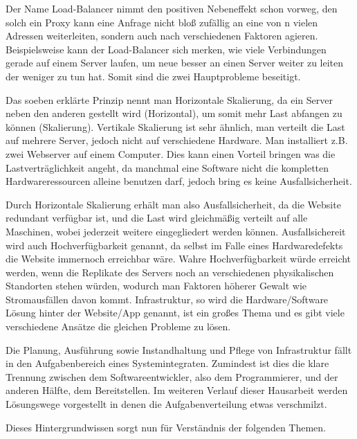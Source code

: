 Der Name Load-Balancer nimmt den positiven Nebeneffekt schon vorweg, den solch ein Proxy kann eine Anfrage nicht bloß zufällig an eine von n vielen Adressen weiterleiten, sondern auch nach verschiedenen Faktoren agieren.
Beispielsweise kann der Load-Balancer sich merken, wie viele Verbindungen gerade auf einem Server laufen, um neue besser an einen Server weiter zu leiten der weniger zu tun hat. Somit sind die zwei Hauptprobleme beseitigt.

Das soeben erklärte Prinzip nennt man Horizontale Skalierung, da ein Server neben den anderen gestellt wird (Horizontal), um somit mehr Last abfangen zu können (Skalierung).
Vertikale Skalierung ist sehr ähnlich, man verteilt die Last auf mehrere Server, jedoch nicht auf verschiedene Hardware. Man installiert z.B. zwei Webserver auf einem Computer. 
Dies kann einen Vorteil bringen was die Lastverträglichkeit angeht, da manchmal eine Software nicht die kompletten Hardwareressourcen alleine benutzen darf, jedoch bring es keine Ausfallsicherheit.

Durch Horizontale Skalierung erhält man also Ausfallsicherheit, da die Website redundant verfügbar ist, und die Last wird gleichmäßig verteilt auf alle Maschinen, wobei jederzeit weitere eingegliedert werden können.
Ausfallsichereit wird auch Hochverfügbarkeit genannt, da selbst im Falle eines Hardwaredefekts die Website immernoch erreichbar wäre. Wahre Hochverfügbarkeit würde erreicht werden, wenn die Replikate des Servers noch
an verschiedenen physikalischen Standorten stehen würden, wodurch man Faktoren höherer Gewalt wie Stromausfällen davon kommt. Infrastruktur, so wird die Hardware/Software Lösung hinter der Website/App genannt, ist ein großes
Thema und es gibt viele verschiedene Ansätze die gleichen Probleme zu lösen.

Die Planung, Ausführung sowie Instandhaltung und Pflege von Infrastruktur fällt in den Aufgabenbereich eines Systemintegraten. Zumindest ist dies die klare Trennung zwischen 
dem Softwareentwickler, also dem Programmierer, und der anderen Hälfte, dem Bereitstellen. Im weiteren Verlauf dieser Hausarbeit werden Lösungswege vorgestellt in denen die Aufgabenverteilung etwas verschmilzt.

Dieses Hintergrundwissen sorgt nun für Verständnis der folgenden Themen. 